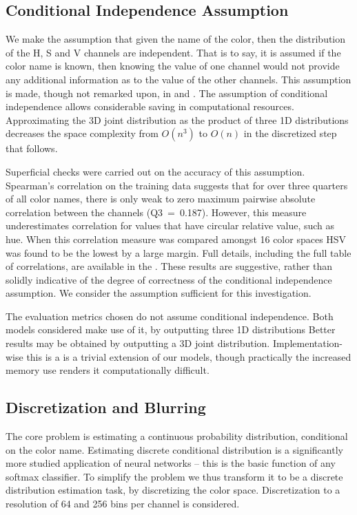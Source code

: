 \documentclass[11pt,a4paper]{article}
\newcommand{\textcite}{\cite}
\begin{document}
\subsection{Conditional Independence Assumption}\label{sec:conditional-independence-assumption}
We make the assumption that given the name of the color, then the distribution of the H, S and V channels are independent.
That is to say, it is assumed if the color name is known, then  knowing the value of one channel would not provide any additional information as to the value  of the other channels.
This assumption is made, though not remarked upon, in \textcite{meomcmahanstone:color} and \textcite{mcmahan2015bayesian}.
The assumption of conditional independence allows considerable saving in computational resources.
Approximating the 3D joint distribution as the product of three 1D distributions decreases the space complexity from $O(n^3)$ to $O(n)$ in the discretized step that follows.


Superficial checks were carried out on the accuracy of this assumption.
Spearman's correlation on the training data suggests that for over three quarters of all color names, there is only weak to zero maximum pairwise absolute correlation between the channels (\mbox{Q3 = 0.187}).
However, this measure underestimates correlation for values that have circular relative value, such as hue.
When this correlation measure was compared amongst 16 color spaces HSV was found to be the lowest by a large margin.
Full details, including the full table of correlations, are available in the .
These results are suggestive, rather than solidly indicative of the degree of correctness of the conditional independence assumption.
We consider the assumption sufficient for this investigation.

The evaluation metrics chosen do not assume conditional independence.
Both models considered make use of it, by outputting three 1D distributions
Better results may be obtained by outputting a 3D joint distribution.
Implementation-wise this is a is a trivial extension of our models, 
though practically the increased memory use renders it computationally difficult.


\subsection{Discretization and Blurring}\label{sec:discretization-and-blurring}
The core problem is estimating a continuous  probability distribution, conditional on the color name.
Estimating discrete conditional distribution is a significantly more studied application of neural networks
-- this is the basic function of any softmax classifier.
To simplify the problem we thus transform it to be a discrete distribution estimation task, by discretizing the color space.
Discretization to a resolution of 64 and 256 bins per channel is considered.
\end{document}
